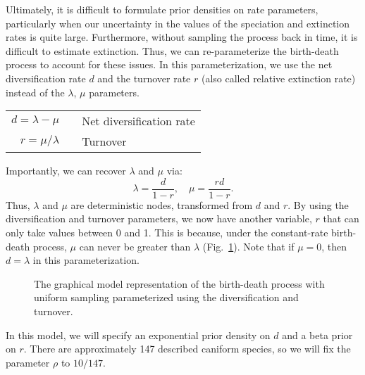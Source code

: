 Ultimately, it is difficult to formulate prior densities on rate parameters, particularly when our uncertainty in the values of the speciation and extinction rates is quite large. 
Furthermore, without sampling the process back in time, it is difficult to estimate extinction. 
Thus, we can re-parameterize the birth-death process to account for these issues.
In this parameterization, we use the net diversification rate $d$ and the turnover rate $r$ (also called relative extinction rate) instead of the $\lambda$, $\mu$ parameters.
\begin{center}
\begin{tabular}{rcl}
$d=\lambda-\mu$ & \hspace{6mm} & Net diversification rate\\
$r=\mu / \lambda$ & & Turnover\\
\end{tabular} 
\end{center}
Importantly, we can recover $\lambda$ and $\mu$ via: 
\begin{equation}\label{lambdamufxns}
\lambda=\frac{d}{1-r}, \quad \mu=\frac{rd}{1-r}.
\end{equation}
Thus, $\lambda$ and $\mu$ are deterministic nodes, transformed from $d$ and $r$. 
By using the diversification and turnover parameters, we now have another variable, $r$ that can only take values between 0 and 1.
This is because, under the constant-rate birth-death process, $\mu$ can never be greater than $\lambda$ (Fig.~\ref{bdrGMFig2}). 
Note that if $\mu=0$, then $d = \lambda$ in this parameterization.


\begin{figure}[h!]
\centering
{}
\caption{\small The graphical model representation of the birth-death process with uniform sampling parameterized using the diversification and turnover.}
\label{bdrGMFig2}
\end{figure}

In this model, we will specify an exponential prior density on $d$ and a beta prior on $r$.
There are approximately 147 described caniform species, so we will fix the parameter $\rho$ to $10/147$.



